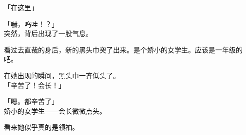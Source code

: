 「在这里」

「嚇，呜哇！？」\\

突然，背后出现了一股气息。

看过去直哉的身后，新的黑头巾突了出来。是个娇小的女学生。应该是一年级的吧。

在她出现的瞬间，黑头巾一齐低头了。\\

「辛苦了！会长！」

「嗯。都辛苦了」\\

娇小的女学生——会长微微点头。

看来她似乎真的是领袖。
